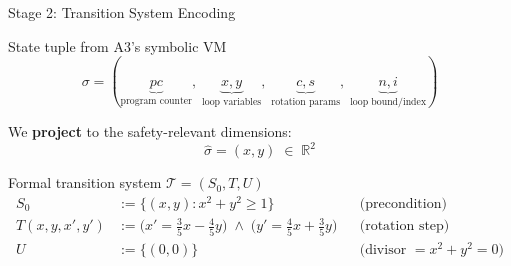 \documentclass[aspectratio=169]{beamer}
\begin{document}
\begin{frame}{Stage 2: Transition System Encoding}
\begin{block}{State tuple from A3's symbolic VM}
\vspace{-0.5em}
\[
  \sigma = (\underbrace{\mathit{pc}}_{\text{program counter}},\;
            \underbrace{x, y}_{\text{loop variables}},\;
            \underbrace{c, s}_{\text{rotation params}},\;
            \underbrace{n, i}_{\text{loop bound/index}})
\]
\end{block}

\vspace{0.2em}
We \textbf{project} to the safety-relevant dimensions:
\[
  \hat\sigma = (x, y) \;\in\; \mathbb{R}^2
\]

\vspace{0.3em}
\begin{block}{Formal transition system $\mathcal{T} = (S_0, T, U)$}
\begin{align*}
  S_0 &:= \bigl\{(x,y) : x^2 + y^2 \ge 1\bigr\}
         && \text{(precondition)}\\[4pt]
  T(x,y,x',y') &:= \bigl(x' = \tfrac{3}{5}x - \tfrac{4}{5}y\bigr) \;\wedge\;
                     \bigl(y' = \tfrac{4}{5}x + \tfrac{3}{5}y\bigr)
         && \text{(rotation step)}\\[4pt]
  U &:= \bigl\{(0, 0)\bigr\}
         && \text{(divisor $= x^2{+}y^2 = 0$)}
\end{align*}
\end{block}
\end{frame}
\end{document}
